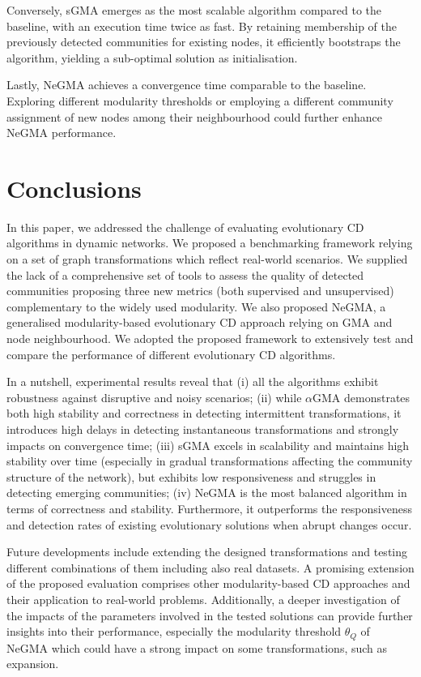 \documentclass[letterpaper]{article}
\begin{document}
Conversely, sGMA emerges as the most scalable algorithm compared to the baseline, with an execution time twice as fast. By retaining membership of the previously detected communities for existing nodes, it efficiently bootstraps the algorithm, yielding a sub-optimal solution as initialisation.

Lastly, NeGMA achieves a convergence time comparable to the baseline.
Exploring different modularity thresholds or employing a different community assignment of new nodes among their neighbourhood could further enhance NeGMA performance.

\section{Conclusions}
\label{s:conclusions}

In this paper, we addressed the challenge of evaluating evolutionary CD algorithms in dynamic networks. We proposed a benchmarking framework relying on a set of graph transformations which reflect real-world scenarios. We supplied the lack of a comprehensive set of tools to assess the quality of detected communities proposing three new metrics (both supervised and unsupervised) complementary to the widely used modularity. We also proposed NeGMA, a generalised modularity-based evolutionary CD approach relying on GMA and node neighbourhood.
We adopted the proposed framework to extensively test and compare the performance of different evolutionary CD algorithms.

In a nutshell, experimental results reveal that (i) all the algorithms exhibit robustness against disruptive and noisy scenarios; (ii) while $\alpha$GMA demonstrates both high stability and correctness in detecting intermittent transformations, it introduces high delays in detecting instantaneous transformations and strongly impacts on convergence time; (iii) sGMA excels in scalability and maintains high stability over time (especially in gradual transformations affecting the community structure of the network), but exhibits low responsiveness and struggles in detecting emerging communities; (iv) NeGMA is the most balanced algorithm in terms of correctness and stability. Furthermore, it outperforms the responsiveness and detection rates of existing evolutionary solutions when abrupt changes occur.

Future developments include extending the designed transformations and testing different combinations of them including also real datasets. A promising extension of the proposed evaluation comprises other modularity-based CD approaches and their application to real-world problems. Additionally, a deeper investigation of the impacts of the parameters involved in the tested solutions can provide further insights into their performance, especially the modularity threshold $\theta_Q$ of NeGMA which could have a strong impact on some transformations, such as expansion.
\end{document}
